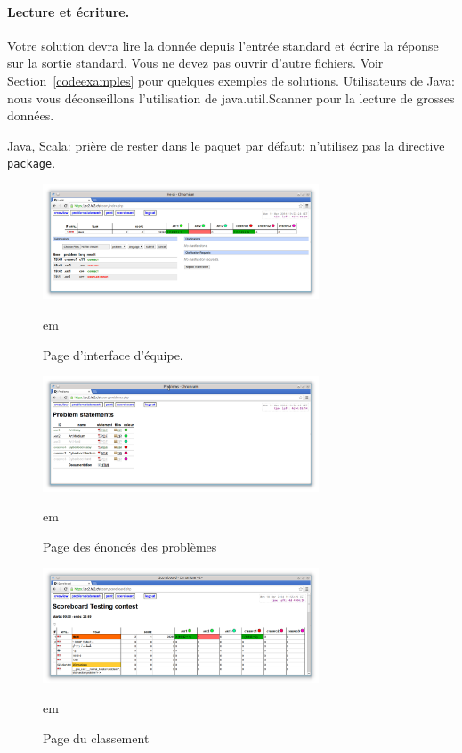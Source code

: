 \paragraph{Lecture et écriture.}
Votre solution devra lire la donnée depuis l'entrée
standard et écrire la réponse sur la sortie standard.
Vous ne devez pas ouvrir d'autre fichiers.
Voir Section~\ref{codeexamples} pour quelques exemples
de solutions. Utilisateurs de Java: nous vous déconseillons
l'utilisation de java.util.Scanner pour la lecture de
grosses données.

Java, Scala: prière de rester dans le paquet par défaut: n'utilisez pas la directive \texttt{package}.

\begin{figure}[t]
\begin{center}
\includegraphics[width=0.73\textwidth]{overview.png}
\end{center}
 em
\caption{Page d'interface d'équipe.}
\label{fig:overview}

\begin{center}
\includegraphics[width=0.73\textwidth]{statements.png}
\end{center}
 em
\caption{Page des énoncés des problèmes}
\label{fig:statements}

\begin{center}
\includegraphics[width=0.73\textwidth]{ranking.png}
\end{center}
 em
\caption{Page du classement}
\label{fig:ranking}
\end{figure}



